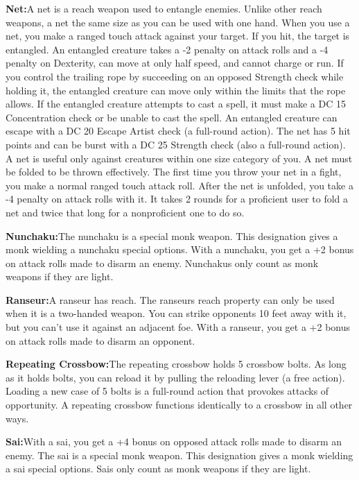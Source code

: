 \textbf{Net:}{A net is a reach weapon used to entangle enemies. Unlike other reach weapons, a net the same size as you can be used with one hand. When you use a net, you make a ranged touch attack against your target. If you hit, the target is entangled. An entangled creature takes a -2 penalty on attack rolls and a -4 penalty on Dexterity, can move at only half speed, and cannot charge or run. If you control the trailing rope by succeeding on an opposed Strength check while holding it, the entangled creature can move only within the limits that the rope allows. If the entangled creature attempts to cast a spell, it must make a DC 15 Concentration check or be unable to cast the spell. An entangled creature can escape with a DC 20 Escape Artist check (a full-round action). The net has 5 hit points and can be burst with a DC 25 Strength check (also a full-round action). A net is useful only against creatures within one size category of you. A net must be folded to be thrown effectively. The first time you throw your net in a fight, you make a normal ranged touch attack roll. After the net is unfolded, you take a -4 penalty on attack rolls with it. It takes 2 rounds for a proficient user to fold a net and twice that long for a nonproficient one to do so.}

\textbf{Nunchaku:}{The nunchaku is a special monk weapon. This designation gives a monk wielding a nunchaku special options. With a nunchaku, you get a +2 bonus on attack rolls made to disarm an enemy. Nunchakus only count as monk weapons if they are light.}

\textbf{Ranseur:}{A ranseur has reach. The ranseurs reach property can only be used when it is a two-handed weapon. You can strike opponents 10 feet away with it, but you can't use it against an adjacent foe. With a ranseur, you get a +2 bonus on attack rolls made to disarm an opponent.}

\textbf{Repeating Crossbow:}{The repeating crossbow holds 5 crossbow bolts. As long as it holds bolts, you can reload it by pulling the reloading lever (a free action). Loading a new case of 5 bolts is a full-round action that provokes attacks of opportunity. A repeating crossbow functions identically to a crossbow in all other ways.}

\textbf{Sai:}{With a sai, you get a +4 bonus on opposed attack rolls made to disarm an enemy. The sai is a special monk weapon. This designation gives a monk wielding a sai special options. Sais only count as monk weapons if they are light.}

